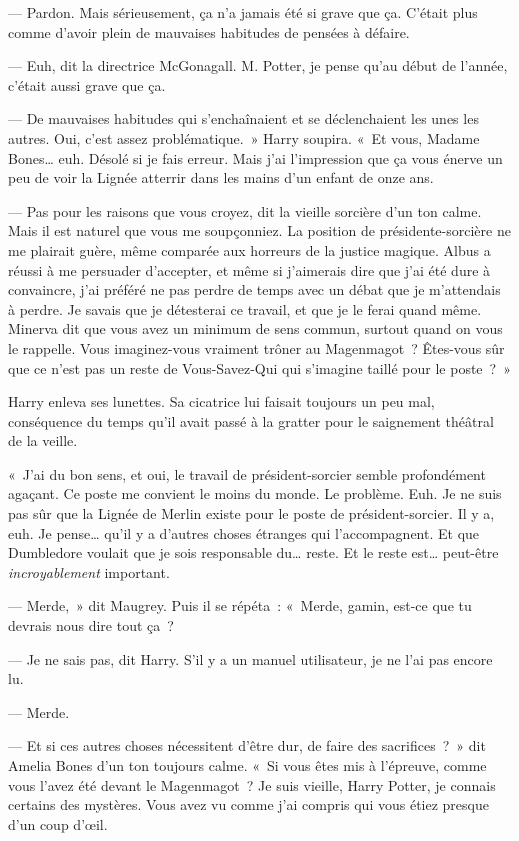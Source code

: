 --- Pardon.
Mais sérieusement, ça n'a jamais été si grave que ça.
C'était plus comme d'avoir plein de mauvaises habitudes de pensées à défaire.

--- Euh, dit la directrice McGonagall.
M. Potter, je pense qu'au début de l'année, c'était aussi grave que ça.

--- De mauvaises habitudes qui s'enchaînaient et se déclenchaient les unes les autres.
Oui, c'est assez problématique.~»
Harry soupira.
«~Et vous, Madame Bones… euh.
Désolé si je fais erreur.
Mais j'ai l'impression que ça vous énerve un peu de voir la Lignée atterrir dans les mains d'un enfant de onze ans.

--- Pas pour les raisons que vous croyez, dit la vieille sorcière d'un ton calme.
Mais il est naturel que vous me soupçonniez.
La position de présidente-sorcière ne me plairait guère, même comparée aux horreurs de la justice magique.
Albus a réussi à me persuader d'accepter, et même si j'aimerais dire que j'ai été dure à convaincre, j'ai préféré ne pas perdre de temps avec un débat que je m'attendais à perdre.
Je savais que je détesterai ce travail, et que je le ferai quand même.
Minerva dit que vous avez un minimum de sens commun, surtout quand on vous le rappelle.
Vous imaginez-vous vraiment trôner au Magenmagot~?
Êtes-vous sûr que ce n'est pas un reste de Vous-Savez-Qui qui s'imagine taillé pour le poste~?~»

Harry enleva ses lunettes.
Sa cicatrice lui faisait toujours un peu mal, conséquence du temps qu'il avait passé à la gratter pour le saignement théâtral de la veille.

«~J'ai du bon sens, et oui, le travail de président-sorcier semble profondément agaçant.
Ce poste me convient le moins du monde.
Le problème.
Euh. Je ne suis pas sûr que la Lignée de Merlin existe pour le poste de président-sorcier.
Il y a, euh.
Je pense… qu'il y a d'autres choses étranges qui l'accompagnent.
Et que Dumbledore voulait que je sois responsable du… reste.
Et le reste est… peut-être \emph{incroyablement} important.

--- Merde,~» dit Maugrey.
Puis il se répéta~: «~Merde, gamin, est-ce que tu devrais nous dire tout ça~?

--- Je ne sais pas, dit Harry.
S'il y a un manuel utilisateur, je ne l'ai pas encore lu.

--- Merde.

--- Et si ces autres choses nécessitent d'être dur, de faire des sacrifices~?~»
dit Amelia Bones d'un ton toujours calme.
«~Si vous êtes mis à l'épreuve, comme vous l'avez été devant le Magenmagot~?
Je suis vieille, Harry Potter, je connais certains des mystères.
Vous avez vu comme j'ai compris qui vous étiez presque d'un coup d'œil.

